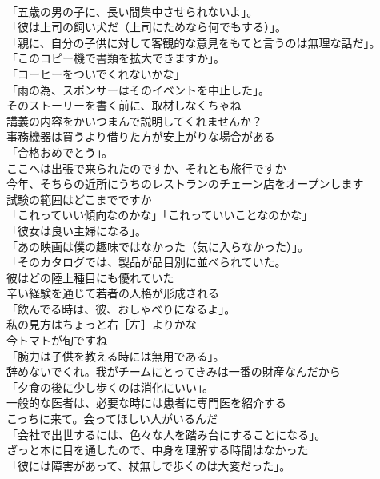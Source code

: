 \documentclass[8pt]{extreport}
\begin{document}
\begin{CJK}{UTF8}{min}
\\	「五歳の男の子に、長い間集中させられないよ」。	
\\	「彼は上司の飼い犬だ（上司にためなら何でもする）」。	
\\	「親に、自分の子供に対して客観的な意見をもてと言うのは無理な話だ」。	
\\	「このコピー機で書類を拡大できますか」。	
\\	「コーヒーをついでくれないかな」	
\\	「雨の為、スポンサーはそのイベントを中止した」。	
\\	そのストーリーを書く前に、取材しなくちゃね	
\\	講義の内容をかいつまんで説明してくれませんか？	
\\	事務機器は買うより借りた方が安上がりな場合がある	
\\	「合格おめでとう」。	
\\	ここへは出張で来られたのですか、それとも旅行ですか	
\\	今年、そちらの近所にうちのレストランのチェーン店をオープンします	
\\	試験の範囲はどこまでですか	
\\	「これっていい傾向なのかな」「これっていいことなのかな」	
\\	「彼女は良い主婦になる」。	
\\	「あの映画は僕の趣味ではなかった（気に入らなかった）」。	
\\	「そのカタログでは、製品が品目別に並べられていた。	
\\	彼はどの陸上種目にも優れていた	
\\	辛い経験を通じて若者の人格が形成される	
\\	「飲んでる時は、彼、おしゃべりになるよ」。	
\\	私の見方はちょっと右［左］よりかな	
\\	今トマトが旬ですね	
\\	「腕力は子供を教える時には無用である」。	
\\	辞めないでくれ。我がチームにとってきみは一番の財産なんだから	
\\	「夕食の後に少し歩くのは消化にいい」。	
\\	一般的な医者は、必要な時には患者に専門医を紹介する	
\\	こっちに来て。会ってほしい人がいるんだ	
\\	「会社で出世するには、色々な人を踏み台にすることになる」。	
\\	ざっと本に目を通したので、中身を理解する時間はなかった	
\\	「彼には障害があって、杖無しで歩くのは大変だった」。	

\end{CJK}
\end{document}
